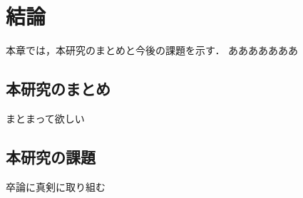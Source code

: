 \chapter{結論}
\label{conclusion}

本章では，本研究のまとめと今後の課題を示す．
あああああああ

\section{本研究のまとめ}

まとまって欲しい

\section{本研究の課題}

卒論に真剣に取り組む

